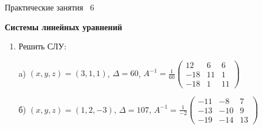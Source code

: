 \documentclass[a5paper,11pt]{extarticle}
\begin{document}
{\centering \small Практические занятия \textnumero~6 \par\bfseries \large Системы линейных уравнений\par}

\begin{enumerate}
\item Решить СЛУ:\\

{\raggedleft

		a) \underline{$(x,y,z)=(3,1,1)$},\quad
		$\Delta=60$, \quad
		$A^{-1}
			=\frac{1}{60}
			\begin{pmatrix}
				12 & 6 & 6\\
				-18 & 11 & 1\\
				-18 & 1 & 11
			\end{pmatrix}$
		
		б)
		\underline{$(x,y,z)=(1,2,-3)$},\quad
		$\Delta=107$, \quad
		$A^{-1}
			=\frac{1}{-2}
			\begin{pmatrix}
				-11 & -8 & 7\\
				-13 & -10 & 9\\
				-19 & -14 & 13
			\end{pmatrix}$
			
}
\end{enumerate}
\end{document}
